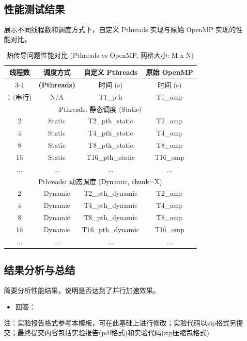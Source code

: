 \documentclass{SYSUReport}
\begin{document}
\subsection{性能测试结果}
展示不同线程数和调度方式下，自定义 Pthreads 实现与原始 OpenMP 实现的性能对比。
\begin{table}[h!]
\centering
\caption{热传导问题性能对比 (Pthreads vs OpenMP, 网格大小: M x N)}
\begin{tabular}{|c|c|c|c|}
\hline
\textbf{线程数} & \textbf{调度方式} & \textbf{自定义 Pthreads} & \textbf{原始 OpenMP} \\
\cline{3-4} %
 & \textbf{(Pthreads)} & 时间 (s) & 时间 (s) \\
\hline
1 (串行) & N/A & T1\_pth & T1\_omp \\
\hline
\multicolumn{4}{|c|}{Pthreads: 静态调度 (Static)} \\
\hline
2 & Static & T2\_pth\_static & T2\_omp \\
4 & Static & T4\_pth\_static & T4\_omp \\
8 & Static & T8\_pth\_static & T8\_omp \\
16 & Static & T16\_pth\_static & T16\_omp \\
... & ... & ... & ... \\
\hline
\multicolumn{4}{|c|}{Pthreads: 动态调度 (Dynamic, chunk=X)} \\
\hline
2 & Dynamic & T2\_pth\_dynamic & T2\_omp \\
4 & Dynamic & T4\_pth\_dynamic & T4\_omp \\
8 & Dynamic & T8\_pth\_dynamic & T8\_omp \\
16 & Dynamic & T16\_pth\_dynamic & T16\_omp \\
... & ... & ... & ... \\
\hline
\end{tabular}
\label{tab:performance_comparison_time_only}
\end{table}

\subsection{结果分析与总结}
简要分析性能结果，说明是否达到了并行加速效果。
\begin{itemize}
    \item 回答：
\end{itemize}
注：实验报告格式参考本模板，可在此基础上进行修改；实验代码以zip格式另提交；最终提交内容包括实验报告(pdf格式)和实验代码(zip压缩包格式)
\end{document}
